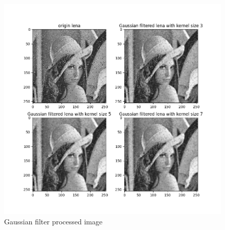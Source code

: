 \begin{figure}[htbp]
    \centering
	\includegraphics[width=\textwidth]{../images/p3/p3b.png}
    \caption{Gaussian filter processed image}
\label{fig:p3b}
\end{figure}



